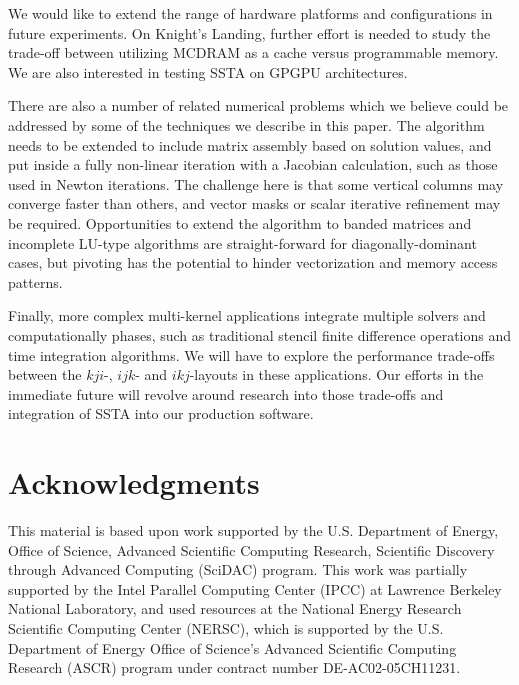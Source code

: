 \documentclass[10pt, conference, compsocconf]{IEEEtran}
\begin{document}
We would like to extend the range of hardware platforms and configurations in
  future experiments.
On Knight's Landing, further effort is needed to study the trade-off between
  utilizing MCDRAM as a cache versus programmable memory.
We are also interested in testing SSTA on GPGPU architectures.

There are also a number of related numerical problems which we believe could be
  addressed by some of the techniques we describe in this paper.
The algorithm needs to be extended to include matrix assembly
  based on solution values, and put inside a fully non-linear iteration
  with a Jacobian calculation, such as those used in Newton iterations.
The challenge here is that some vertical columns may converge faster than
  others, and vector masks or scalar iterative refinement may be required.
Opportunities to extend the algorithm to banded matrices and incomplete LU-type 
  algorithms are straight-forward for diagonally-dominant cases, but
  pivoting has the potential to hinder vectorization and memory access patterns.

Finally, more complex multi-kernel applications integrate multiple solvers and
  computationally phases, such as traditional stencil finite difference
  operations and time integration algorithms. 
We will have to explore the performance trade-offs between
  the \(kji\)-, \(ijk\)- and \(ikj\)-layouts in these applications.
Our efforts in the immediate future will revolve around research into those
  trade-offs and integration of SSTA into our production software.

\section*{Acknowledgments}
\label{sec:ack}
This material is based upon work supported by the U.S. Department of Energy,
Office of Science, Advanced Scientific Computing Research, Scientific
Discovery through Advanced Computing (SciDAC) program.
This work was partially supported by the Intel Parallel Computing Center (IPCC)
at Lawrence Berkeley National Laboratory, and used resources at the National
Energy Research Scientific Computing Center (NERSC), which is supported by
the U.S. Department of Energy Office of Science's Advanced Scientific
Computing Research (ASCR) program under contract number DE-AC02-05CH11231.  



\end{document}
